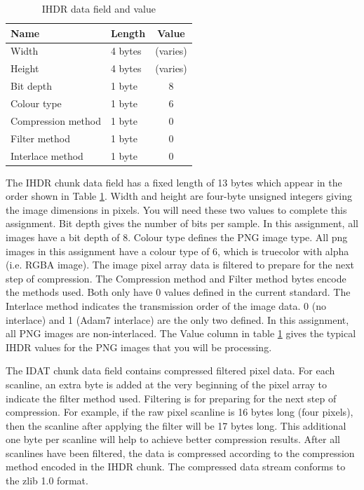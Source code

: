 \begin{table}
	\begin{center}
		\begin{tabular}{llc}             \toprule
			Name               & Length  & Value \\ \midrule
			Width              & 4 bytes & (varies)\\ \midrule
			Height             & 4 bytes & (varies)\\ \midrule
			Bit depth          & 1 byte  & 8\\ \midrule
			Colour type        & 1 byte  & 6\\ \midrule
			Compression method & 1 byte  & 0\\ \midrule
			Filter method      & 1 byte  & 0\\ \midrule
			Interlace method   & 1 byte  & 0\\ \bottomrule
		\end{tabular}
		\caption{IHDR data field and value}
		\label{lab1:tb_IHDR_Data}
	\end{center}
\end{table}
The IHDR chunk data field has a fixed length of 13 bytes which appear in the order shown in Table \ref{lab1:tb_IHDR_Data}. Width and height are four-byte unsigned integers giving the image dimensions in pixels. You will need these two values to complete this assignment. Bit depth gives the number of bits per sample. In this assignment, all images have a bit depth of 8. Colour type defines the PNG image type. All png images in this assignment have a colour type of 6, which is truecolor with alpha (i.e. RGBA image). The image pixel array data is filtered to prepare for the next step of compression. The Compression method and Filter method bytes encode the methods used. Both only have 0 values defined in the current standard. The Interlace method indicates the transmission order of the image data. 0 (no interlace) and 1 (Adam7 interlace) are the only two defined. In this assignment, all PNG images are non-interlaced. The Value column in table \ref{lab1:tb_IHDR_Data} gives the typical IHDR values for the PNG images that you will be processing.  

The IDAT chunk data field contains compressed filtered pixel data. For each scanline, an extra byte is added at the very beginning of the pixel array to indicate the filter method used. Filtering is for preparing for the next step of compression. For example, if the raw pixel scanline is 16 bytes long (four pixels), then the scanline after applying the filter will be 17 bytes long. This additional one byte per scanline will help to achieve better compression results. After all scanlines have been filtered, the data is compressed according to the compression method encoded in the IHDR chunk. The compressed data stream conforms to the zlib 1.0 format.

